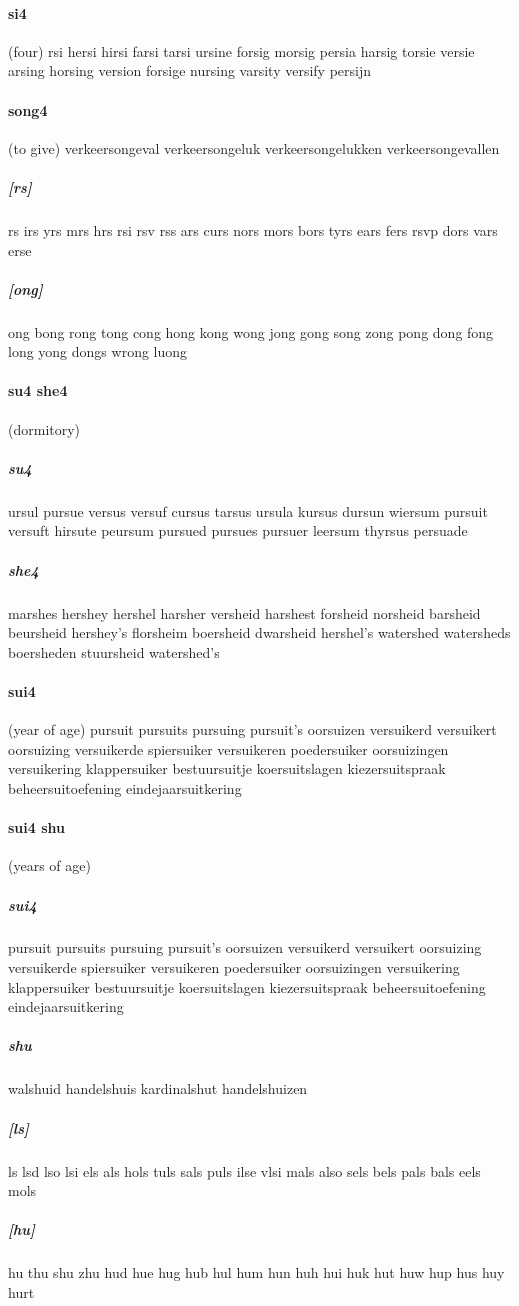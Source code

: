 \documentclass{article}
\begin{document}
\paragraph{si4}(four) rsi
hersi
hirsi
farsi
tarsi
ursine
forsig
morsig
persia
harsig
torsie
versie
arsing
horsing
version
forsige
nursing
varsity
versify
persijn
\paragraph{song4}(to give) verkeersongeval
verkeersongeluk
verkeersongelukken
verkeersongevallen
\subparagraph{[rs]}rs
irs
yrs
mrs
hrs
rsi
rsv
rss
ars
curs
nors
mors
bors
tyrs
ears
fers
rsvp
dors
vars
erse
\subparagraph{[ong]}ong
bong
rong
tong
cong
hong
kong
wong
jong
gong
song
zong
pong
dong
fong
long
yong
dongs
wrong
luong
\paragraph{su4 she4}(dormitory) \subparagraph{su4}ursul
pursue
versus
versuf
cursus
tarsus
ursula
kursus
dursun
wiersum
pursuit
versuft
hirsute
peursum
pursued
pursues
pursuer
leersum
thyrsus
persuade
\subparagraph{she4}marshes
hershey
hershel
harsher
versheid
harshest
forsheid
norsheid
barsheid
beursheid
hershey's
florsheim
boersheid
dwarsheid
hershel's
watershed
watersheds
boersheden
stuursheid
watershed's
\paragraph{sui4}(year of age) pursuit
pursuits
pursuing
pursuit's
oorsuizen
versuikerd
versuikert
oorsuizing
versuikerde
spiersuiker
versuikeren
poedersuiker
oorsuizingen
versuikering
klappersuiker
bestuursuitje
koersuitslagen
kiezersuitspraak
beheersuitoefening
eindejaarsuitkering
\paragraph{sui4 shu}(years of age) \subparagraph{sui4}pursuit
pursuits
pursuing
pursuit's
oorsuizen
versuikerd
versuikert
oorsuizing
versuikerde
spiersuiker
versuikeren
poedersuiker
oorsuizingen
versuikering
klappersuiker
bestuursuitje
koersuitslagen
kiezersuitspraak
beheersuitoefening
eindejaarsuitkering
\subparagraph{shu}walshuid
handelshuis
kardinalshut
handelshuizen
\subparagraph{[ls]}ls
lsd
lso
lsi
els
als
hols
tuls
sals
puls
ilse
vlsi
mals
also
sels
bels
pals
bals
eels
mols
\subparagraph{[hu]}hu
thu
shu
zhu
hud
hue
hug
hub
hul
hum
hun
huh
hui
huk
hut
huw
hup
hus
huy
hurt
\end{document}

